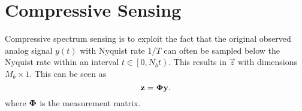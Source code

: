 \section{Compressive Sensing}
Compressive spectrum sensing is to exploit the fact that the original observed analog signal $y(t)$ with Nyquist rate $1/T$ can often be sampled below the Nyquist rate within an interval $t\in \left[0,N_{b}t \right)$. This results in $\vec{z}$ with dimensions $M_b \times 1$. This can be seen as 
\begin{equation}
    \label{eq:nonuniformsampling}
    \boldsymbol{\mathbf{z}} = \boldsymbol{\mathbf{\Phi}}\boldsymbol{\mathbf{y}}.
\end{equation}
where $\boldsymbol{\mathbf{\Phi}}$ is the measurement matrix.
